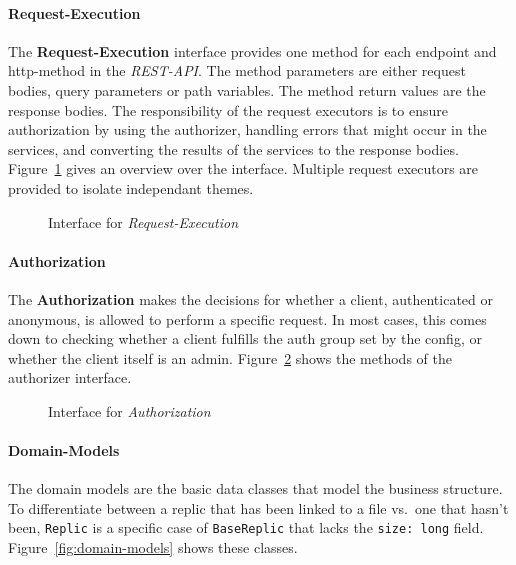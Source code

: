 \paragraph{Request-Execution}
The \textbf{Request-Execution} interface provides one method for each endpoint and http-method in the \textit{REST-API}.
The method parameters are either request bodies, query parameters or path variables.
The method return values are the response bodies.\newline
The responsibility of the request executors is to ensure authorization by using the authorizer, handling errors that might occur in the services, and converting the results of the services to the response bodies.
Figure~\ref{fig:inter-executors} gives an overview over the interface.
Multiple request executors are provided to isolate independant themes.

\begin{figure}
    \centering

    \caption{Interface for \textit{Request-Execution}}
    \label{fig:inter-executors}
\end{figure}

\paragraph{Authorization}
The \textbf{Authorization} makes the decisions for whether a client, authenticated or anonymous, is allowed to perform a specific request. \newline
In most cases, this comes down to checking whether a client fulfills the auth group set by the config, or whether the client itself is an admin.
Figure~\ref{fig:inter-authorizer} shows the methods of the authorizer interface.

\begin{figure}
    \centering

    \caption{Interface for \textit{Authorization}}
    \label{fig:inter-authorizer}
\end{figure}

\paragraph{Domain-Models}
The domain models are the basic data classes that model the business structure. \newline
To differentiate between a replic that has been linked to a file vs.\ one that hasn't been, \texttt{Replic} is a specific case of \texttt{BaseReplic} that lacks the \texttt{size: long} field.
Figure~\ref{fig:domain-models} shows these classes.

